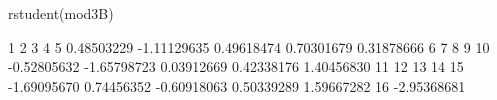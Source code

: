 \begin{Schunk}
\begin{Sinput}
 rstudent(mod3B)
\end{Sinput}
\begin{Soutput}
          1           2           3           4           5 
 0.48503229 -1.11129635  0.49618474  0.70301679  0.31878666 
          6           7           8           9          10 
-0.52805632 -1.65798723  0.03912669  0.42338176  1.40456830 
         11          12          13          14          15 
-1.69095670  0.74456352 -0.60918063  0.50339289  1.59667282 
         16 
-2.95368681 
\end{Soutput}
\end{Schunk}
